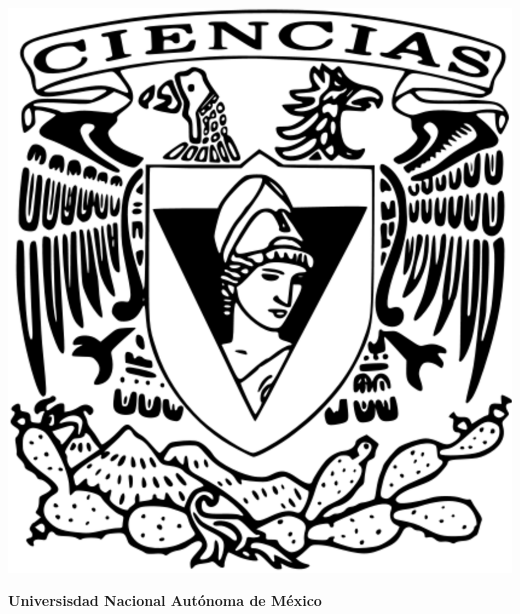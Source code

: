 \documentclass{book}
\begin{document}
\begin{titlepage}
\begin{minipage}{10cm}
    \end{minipage}\hfill
    \begin{minipage}{3cm}
    	\begin{center}
    		\includegraphics[height = 0.14\textheight]{recursos/Logo_FC.png}\par
    	\end{center}
    \end{minipage}
        \centering
        \vspace{1cm}
        
        {\bfseries\LARGE Universisdad Nacional Autónoma de México \par}
        

\end{titlepage}
\end{document}
